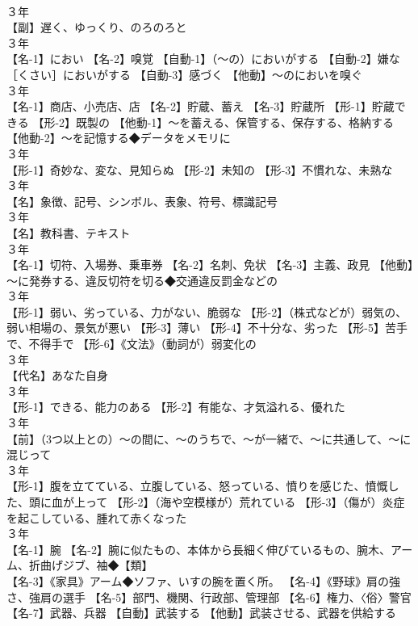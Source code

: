 \documentclass[8pt]{extreport}
\begin{document}
\begin{CJK}{UTF8}{min}
\\	３年	
\\	【副】遅く、ゆっくり、のろのろと
\\	３年	
\\	【名-1】におい 【名-2】嗅覚 【自動-1】（～の）においがする 【自動-2】嫌な［くさい］においがする 【自動-3】感づく 【他動】～のにおいを嗅ぐ
\\	３年	
\\	【名-1】商店、小売店、店 【名-2】貯蔵、蓄え 【名-3】貯蔵所 【形-1】貯蔵できる 【形-2】既製の 【他動-1】～を蓄える、保管する、保存する、格納する 【他動-2】～を記憶する◆データをメモリに
\\	３年	
\\	【形-1】奇妙な、変な、見知らぬ 【形-2】未知の 【形-3】不慣れな、未熟な
\\	３年	
\\	【名】象徴、記号、シンボル、表象、符号、標識記号
\\	３年	
\\	【名】教科書、テキスト
\\	３年	
\\	【名-1】切符、入場券、乗車券 【名-2】名刺、免状 【名-3】主義、政見 【他動】～に発券する、違反切符を切る◆交通違反罰金などの
\\	３年	
\\	【形-1】弱い、劣っている、力がない、脆弱な 【形-2】（株式などが）弱気の、弱い相場の、景気が悪い 【形-3】薄い 【形-4】不十分な、劣った 【形-5】苦手で、不得手で 【形-6】《文法》（動詞が）弱変化の
\\	３年	
\\	【代名】あなた自身
\\	３年	
\\	【形-1】できる、能力のある 【形-2】有能な、才気溢れる、優れた
\\	３年	
\\	【前】（3つ以上との）～の間に、～のうちで、～が一緒で、～に共通して、～に混じって
\\	３年	
\\	【形-1】腹を立てている、立腹している、怒っている、憤りを感じた、憤慨した、頭に血が上って 【形-2】（海や空模様が）荒れている 【形-3】（傷が）炎症を起こしている、腫れて赤くなった
\\	３年	
\\	【名-1】腕 【名-2】腕に似たもの、本体から長細く伸びているもの、腕木、アーム、折曲げジブ、袖◆【類】
\\	【名-3】《家具》アーム◆ソファ、いすの腕を置く所。 【名-4】《野球》肩の強さ、強肩の選手 【名-5】部門、機関、行政部、管理部 【名-6】権力、〈俗〉警官 【名-7】武器、兵器 【自動】武装する 【他動】武装させる、武器を供給する

\end{CJK}
\end{document}
